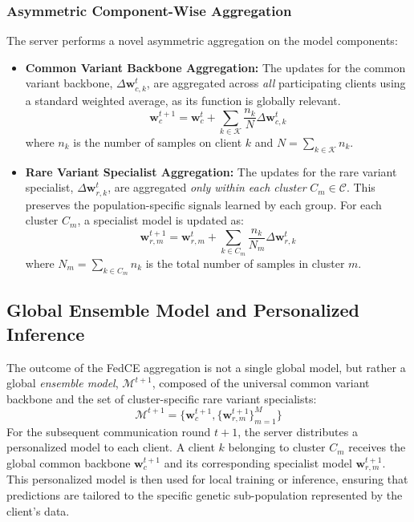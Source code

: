 \documentclass[conference]{IEEEtran}
\begin{document}
\subsubsection{Asymmetric Component-Wise Aggregation}
The server performs a novel asymmetric aggregation on the model components:
\begin{itemize}
    \item \textbf{Common Variant Backbone Aggregation:} The updates for the common variant backbone, $\Delta\mathbf{w}_{c,k}^t$, are aggregated across \textit{all} participating clients using a standard weighted average, as its function is globally relevant.
    \begin{equation}
        \mathbf{w}_c^{t+1} = \mathbf{w}_c^{t} + \sum_{k \in \mathcal{K}} \frac{n_k}{N} \Delta\mathbf{w}_{c,k}^{t}
    \end{equation}
    where $n_k$ is the number of samples on client $k$ and $N = \sum_{k \in \mathcal{K}} n_k$.

    \item \textbf{Rare Variant Specialist Aggregation:} The updates for the rare variant specialist, $\Delta\mathbf{w}_{r,k}^t$, are aggregated \textit{only within each cluster} $C_m \in \mathcal{C}$. This preserves the population-specific signals learned by each group. For each cluster $C_m$, a specialist model is updated as:
    \begin{equation}
        \mathbf{w}_{r,m}^{t+1} = \mathbf{w}_{r,m}^{t} + \sum_{k \in C_m} \frac{n_k}{N_m} \Delta\mathbf{w}_{r,k}^{t}
    \end{equation}
    where $N_m = \sum_{k \in C_m} n_k$ is the total number of samples in cluster $m$.
\end{itemize}

\subsection{Global Ensemble Model and Personalized Inference}
\label{ssec:global_model}
The outcome of the FedCE aggregation is not a single global model, but rather a global \textit{ensemble model}, $\mathcal{M}^{t+1}$, composed of the universal common variant backbone and the set of cluster-specific rare variant specialists:
\begin{equation}
    \mathcal{M}^{t+1} = \{\mathbf{w}_c^{t+1}, \{\mathbf{w}_{r,m}^{t+1}\}_{m=1}^M\}
\end{equation}
For the subsequent communication round $t+1$, the server distributes a personalized model to each client. A client $k$ belonging to cluster $C_m$ receives the global common backbone $\mathbf{w}_c^{t+1}$ and its corresponding specialist model $\mathbf{w}_{r,m}^{t+1}$. This personalized model is then used for local training or inference, ensuring that predictions are tailored to the specific genetic sub-population represented by the client's data.
\end{document}
